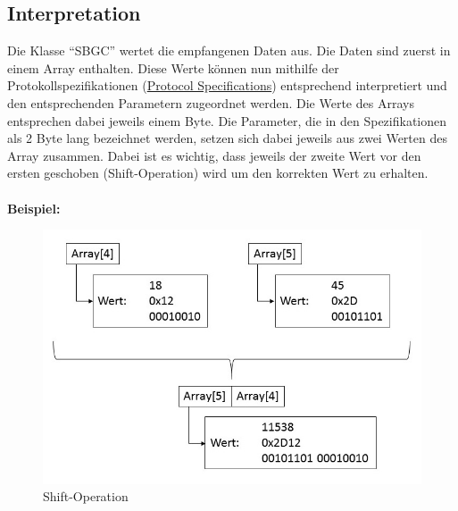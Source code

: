 \documentclass[12pt]{article} %
\begin{document}
	\subsection{Interpretation}
	Die Klasse "`SBGC"' wertet die empfangenen Daten aus. Die Daten sind zuerst in einem Array enthalten. Diese Werte können nun mithilfe der Protokollspezifikationen (\href{https://github.com/kevinsaner91/Gimbal\_Control/blob/master/doc/SBGC\_doc/SimpleBGC\_2\_6\_Serial\_Protocol\_Specification\%20(1).pdf}{Protocol Specifications}) entsprechend interpretiert und den entsprechenden Parametern zugeordnet werden. Die Werte des Arrays entsprechen dabei jeweils einem Byte. Die Parameter, die in den Spezifikationen als 2 Byte lang bezeichnet werden, setzen sich dabei jeweils aus zwei Werten des Array zusammen. Dabei ist es wichtig, dass jeweils der zweite Wert vor den ersten geschoben (Shift-Operation) wird um den korrekten Wert zu erhalten.\\
	\\
	\textbf{Beispiel:}
	
	\begin{figure}[H]
		\centering
		\includegraphics[scale=0.6]{shift}
		\caption{Shift-Operation}
		\label{2}
	\end{figure} 
	
\end{document}
